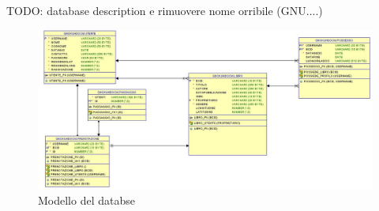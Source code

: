 TODO: database description e rimuovere nome orribile (GNU....)

\begin{figure}[h]
	\includegraphics[width=\textwidth]{Immagini/db_schema.jpg}
	\caption{Modello del databse}
	\label{fig:DatabaseArchitecture}
\end{figure}